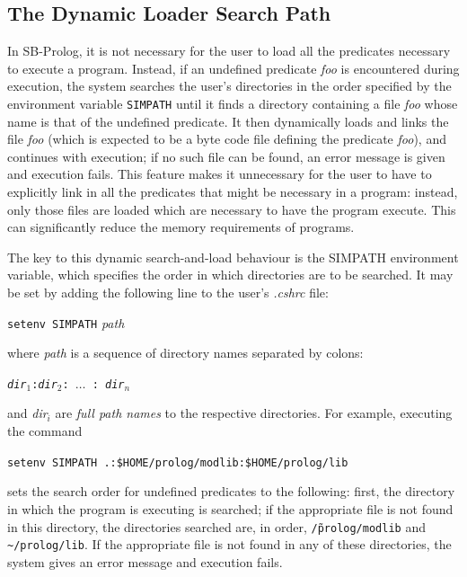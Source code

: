 \subsection{The Dynamic Loader Search Path}\label{search_path}
 
 
In SB-Prolog, it is not necessary for the user to load all the
predicates necessary to execute a program.
Instead, if an undefined predicate {\em foo} is encountered during execution,
the system searches the user's directories in the order specified by
the environment variable {\tt SIMPATH}
until it finds a directory containing
a file {\em foo} whose name is that of the undefined predicate.
It then dynamically loads and links the file {\em foo}
(which is expected to be a byte code file
defining the predicate {\em foo}),
and continues with execution; if no such file can be found, an error message is
given and execution fails.
This feature makes it unnecessary for the user to have to explicitly
link in all the predicates that might be necessary in a program:
instead, only those files are loaded which are necessary to have the
program execute.
This can significantly reduce the memory requirements of programs.

The key to this dynamic search-and-load behaviour is the SIMPATH environment
variable, which specifies the order in which directories are to be searched.
It may be set by adding the following line to the user's {\em .cshrc} file:
\begin{center}
{\verb|setenv SIMPATH| {\em path}}
\end{center}
where {\em path} is a sequence of directory names separated by colons:
\begin{center}
{\tt {\em dir}$_1${:}{\em dir}$_2$: $\ldots$ : {\em dir}$_n$}
\end{center}
and {\em dir}$_i$ are {\em full path names}
to the respective directories.
For example, executing the command
\begin{center}
{\tt setenv SIMPATH .:\$HOME/prolog/modlib:\$HOME/prolog/lib}
\end{center}
sets the search order for undefined predicates to the following: first, the
directory in which the program is executing is searched;
if the appropriate file is not found in this directory,
the directories searched are, in order, {\tt \~/prolog/modlib} and
{\tt \~{}/prolog/lib}.
If the appropriate file is not found in any
of these directories, the system gives an error message and execution fails.

